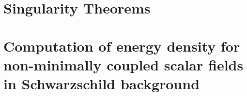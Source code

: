 \documentclass[12pt, a4paper]{book}
\begin{document}
\chapter{Singularity Theorems}
\label{ch:singularity-theorems} 


\appendix
\chapter[Energy density in Schwarzschild background]{Computation of energy density for non-minimally coupled scalar fields in Schwarzschild background}
\label{app:visser}


\printbibliography[heading=bibintoc]
\end{document}
